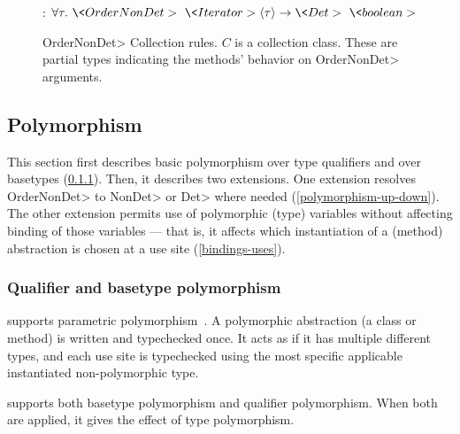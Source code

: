 \begin{figure}
    :
    $
    \forallt{\tau} \<OrderNonDet>\ \<Iterator>\angles{\tau} \rightarrow
    \<Det> \ \<boolean>
    $


\caption{\<OrderNonDet> Collection rules.  $C$ is a collection class.
    These are partial types indicating the methods' behavior on
    \<OrderNonDet> arguments.}
\label{fig-ordernondet-rules}
\end{figure}

\subsection{Polymorphism}\label{polymorphism}

This section first describes basic polymorphism over type qualifiers and
over basetypes (\cref{sec:basic-polymorphism}).  Then, it describes two
extensions.
One extension resolves \<OrderNonDet> to \<NonDet> or \<Det> where
needed (\cref{polymorphism-up-down}).
The other extension permits use of polymorphic (type) variables without
affecting binding of those variables --- that is, it affects which
instantiation of a (method) abstraction is chosen at a use site
(\cref{bindings-uses}).



\subsubsection{Qualifier and basetype polymorphism}\label{sec:basic-polymorphism}

\OurTypeSystem supports parametric
polymorphism~\cite{Abadi:1989:FIM:77350.77373,Plotkin:1993:LPP:645891.671433}.
A polymorphic abstraction (a class or method) is written and
typechecked once.
It acts as if it has multiple different types, and each use site is
typechecked using the most specific applicable instantiated
non-polymorphic type.




\OurTypeSystem supports both basetype polymorphism and qualifier polymorphism.
When both are applied, it gives the effect of type polymorphism.

